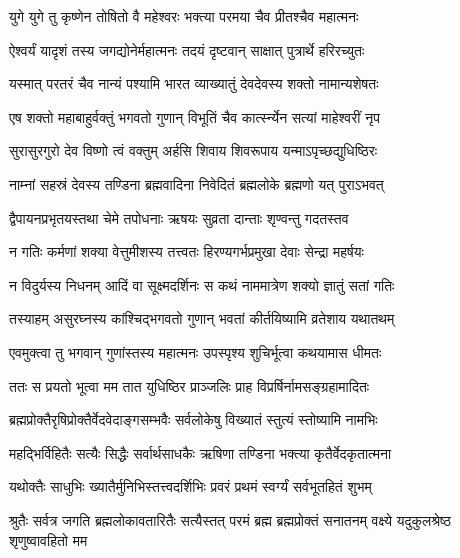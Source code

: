 \twolineshloka
{युगे युगे तु कृष्णेन तोषितो वै महेश्वरः}
{भक्त्या परमया चैव प्रीतश्चैव महात्मनः}%

\twolineshloka
{ऐश्वर्यं यादृशं तस्य जगद्योनेर्महात्मनः}
{तदयं दृष्टवान् साक्षात् पुत्रार्थे हरिरच्युतः}%

\twolineshloka
{यस्मात् परतरं चैव नान्यं पश्यामि भारत}
{व्याख्यातुं देवदेवस्य शक्तो नामान्यशेषतः}%

\twolineshloka
{एष शक्तो महाबाहुर्वक्तुं भगवतो गुणान्}
{विभूतिं चैव कार्त्स्न्येन सत्यां माहेश्वरीं नृप}%

\twolineshloka
{सुरासुरगुरो देव विष्णो त्वं वक्तुम् अर्हसि}
{शिवाय शिवरूपाय यन्माऽपृच्छद्युधिष्ठिरः}%

\twolineshloka
{नाम्नां सहस्रं देवस्य तण्डिना ब्रह्मवादिना}
{निवेदितं ब्रह्मलोके ब्रह्मणो यत् पुराऽभवत्}%

\twolineshloka
{द्वैपायनप्रभृतयस्तथा चेमे तपोधनाः}
{ऋषयः सुव्रता दान्ताः शृण्वन्तु गदतस्तव}%


\twolineshloka
{न गतिः कर्मणां शक्या वेत्तुमीशस्य तत्त्वतः}
{हिरण्यगर्भप्रमुखा देवाः सेन्द्रा महर्षयः}%

\twolineshloka
{न विदुर्यस्य निधनम् आदिं वा सूक्ष्मदर्शिनः}
{स कथं नाममात्रेण शक्यो ज्ञातुं सतां गतिः}%

\twolineshloka
{तस्याहम् असुरघ्नस्य कांश्चिद्भगवतो गुणान्}
{भवतां कीर्तयिष्यामि व्रतेशाय यथातथम्}%

\twolineshloka
{एवमुक्त्वा तु भगवान् गुणांस्तस्य महात्मनः}
{उपस्पृश्य शुचिर्भूत्वा कथयामास धीमतः}%

\twolineshloka
{ततः स प्रयतो भूत्वा मम तात युधिष्ठिर}
{प्राञ्जलिः प्राह विप्रर्षिर्नामसङ्ग्रहामादितः}%


\twolineshloka
{ब्रह्मप्रोक्तैरृषिप्रोक्तैर्वेदवेदाङ्गसम्भवैः}
{सर्वलोकेषु विख्यातं स्तुत्यं स्तोष्यामि नामभिः}%

\twolineshloka
{महद्भिर्विहितैः सत्यैः सिद्धैः सर्वार्थसाधकैः}
{ऋषिणा तण्डिना भक्त्या कृतैर्वेदकृतात्मना}%

\twolineshloka
{यथोक्तैः साधुभिः ख्यातैर्मुनिभिस्तत्त्वदर्शिभिः}
{प्रवरं प्रथमं स्वर्ग्यं सर्वभूतहितं शुभम्}%

\threelineshloka
{श्रुतैः सर्वत्र जगति ब्रह्मलोकावतारितैः}
{सत्यैस्तत् परमं ब्रह्म ब्रह्मप्रोक्तं सनातनम्}
{वक्ष्ये यदुकुलश्रेष्ठ शृणुष्वावहितो मम}%

